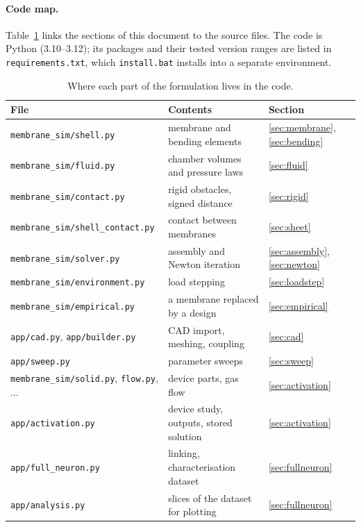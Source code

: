 \documentclass[11pt,a4paper]{article}
\newcommand{\code}[1]{\texttt{#1}}
\theoremstyle{remark}
\begin{document}
\paragraph{Code map.} Table~\ref{tab:code} links the sections of this document to the source
files. The code is Python (3.10--3.12); its packages and their tested version ranges are listed in
\code{requirements.txt}, which \code{install.bat} installs into a separate environment.

\begin{table}[h]
\centering\small
\begin{tabular}{@{}lll@{}}
\toprule
File & Contents & Section \\
\midrule
\code{membrane\_sim/shell.py} & membrane and bending elements & \ref{sec:membrane}, \ref{sec:bending} \\
\code{membrane\_sim/fluid.py} & chamber volumes and pressure laws & \ref{sec:fluid} \\
\code{membrane\_sim/contact.py} & rigid obstacles, signed distance & \ref{sec:rigid} \\
\code{membrane\_sim/shell\_contact.py} & contact between membranes & \ref{sec:sheet} \\
\code{membrane\_sim/solver.py} & assembly and Newton iteration & \ref{sec:assembly}, \ref{sec:newton} \\
\code{membrane\_sim/environment.py} & load stepping & \ref{sec:loadstep} \\
\code{membrane\_sim/empirical.py} & a membrane replaced by a design & \ref{sec:empirical} \\
\code{app/cad.py}, \code{app/builder.py} & CAD import, meshing, coupling & \ref{sec:cad} \\
\code{app/sweep.py} & parameter sweeps & \ref{sec:sweep} \\
\code{membrane\_sim/solid.py}, \code{flow.py}, ... & device parts, gas flow & \ref{sec:activation} \\
\code{app/activation.py} & device study, outputs, stored solution & \ref{sec:activation} \\
\code{app/full\_neuron.py} & linking, characterisation dataset & \ref{sec:fullneuron} \\
\code{app/analysis.py} & slices of the dataset for plotting & \ref{sec:fullneuron} \\
\bottomrule
\end{tabular}
\caption{Where each part of the formulation lives in the code.}
\label{tab:code}
\end{table}
\end{document}
